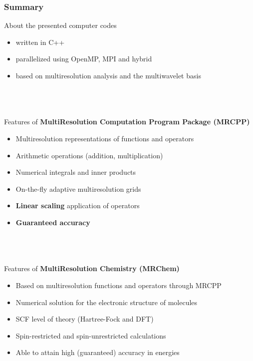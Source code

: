 \begin{frame}
    \frametitle{Summary}
    About the presented computer codes
    \begin{itemize}
	\item	written in C++
	\item	parallelized using OpenMP, MPI and hybrid
	\item	based on multiresolution analysis and the multiwavelet basis
    \end{itemize}
    \ \\
    \ \\
    \ \\
    Features of \textbf{MultiResolution Computation Program Package (MRCPP)}
    \begin{itemize}
	\item	Multiresolution representations of functions and operators
	\item	Arithmetic operations (addition, multiplication)
	\item	Numerical integrals and inner products
	\item	On-the-fly adaptive multiresolution grids
	\item	\textbf{Linear scaling} application of operators
	\item	\textbf{Guaranteed accuracy}
    \end{itemize}
    \ \\
    \ \\
    \ \\
    Features of \textbf{MultiResolution Chemistry (MRChem)}
    \begin{itemize}
	\item	Based on multiresolution functions and operators through MRCPP
	\item	Numerical solution for the electronic structure of molecules
	\item	SCF level of theory (Hartree-Fock and DFT)
	\item	Spin-restricted and spin-unrestricted calculations
	\item	Able to attain high (guaranteed) accuracy in energies
    \end{itemize}
\end{frame}

